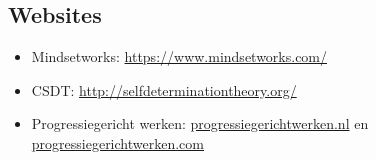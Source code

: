\documentclass{article}
\begin{document}
\subsection{Websites}
\begin{itemize}
	\item {\fontsize{11pt}{13.2pt}\selectfont Mindsetworks: \href{https://www.mindsetworks.com/}{https://www.mindsetworks.com/}}
	\item {\fontsize{11pt}{13.2pt}\selectfont CSDT: \href{http://selfdeterminationtheory.org/}{http://selfdeterminationtheory.org/}}
	\item {\fontsize{11pt}{13.2pt}\selectfont Progressiegericht werken: \href{https://progressiegerichtwerken.nl/}{progressiegerichtwerken.nl} en \href{https://progressiegerichtwerken.com/}{progressiegerichtwerken.com}}
\end{itemize}\par
\end{document}
